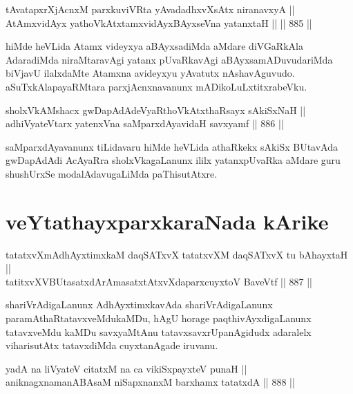 
\begin{shl}
tAvatapxrXjAcnxM parxkuviVRta yAvadadhxvXsAtx niranavxyA || \\
AtAmxvidAyx yathoVkAtxtamxvidAyxBAyxseVna yatanxtaH ||  \hfill || 885 ||  
\end{shl}

\begin{artha}
hiMde heVLida Atamx videyxya aBAyxsadiMda aMdare diVGaRkAla AdaradiMda niraMtaravAgi yatanx pUvaRkavAgi aBAyxsamADuvudariMda biVjavU ilalxdaMte Atamxna avideyxyu yAvatutx nAshavAguvudo. aSuTxkAlapayaRMtara parxjAcnxnavanunx mADikoLuLxtitxrabeVku.
\end{artha}

\begin{shl}
sholxVkAMshacx gwDapAdAdeVyaRthoVkAtxthaRsayx sAkiSxNaH || \\
adhiVyateV\s tarx yatenxVna saMparxdAyavidaH savxyamf \hfill || 886 ||  
\end{shl}

\begin{artha}
saMparxdAyavanunx tiLidavaru hiMde heVLida athaRkekx sAkiSx BUtavAda gwDapAdAdi AcAyaRra sholxVkagaLanunx ililx yatanxpUvaRka aMdare guru shushUrxSe modalAdavugaLiMda paThisutAtxre.
\end{artha}

\section*{veYtathayxparxkaraNada kArike}


\begin{shl}
tatatxvXmAdhAyxtimxkaM daqSATxvX tatatxvXM daqSATxvX tu bAhayxtaH ||  \\
tatitxvXVBUtasatxdArAmasatxtAtxvXdaparxcuyxtoV BaveVtf \hfill || 887 ||  
\end{shl}

\begin{artha}
shariVrAdigaLanunx AdhAyxtimxkavAda shariVrAdigaLanunx paramAthaRtatavxveMdukaMDu, hAgU horage paqthivAyxdigaLanunx tatavxveMdu kaMDu savxyaMtAnu tatavxsavxrUpanAgidudx adaralelx viharisutAtx tatavxdiMda cuyxtanAgade iruvanu.
\end{artha}


\begin{shl}
yadA na liVyateV citatxM na ca vikiSxpayxteV punaH || \\
aniknagxnamanABAsaM niSapxnanxM barxhamx tatatxdA \hfill || 888 ||  
\end{shl}

